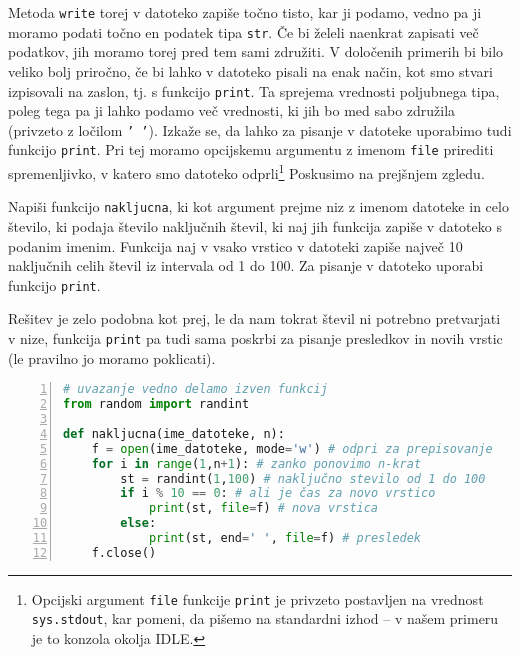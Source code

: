 Metoda \texttt{write} torej v datoteko zapiše točno tisto, kar ji podamo, vedno pa ji moramo podati točno en podatek tipa \texttt{str}. Če bi želeli naenkrat zapisati več podatkov, jih moramo torej pred tem sami združiti. V določenih primerih bi bilo veliko bolj priročno, če bi lahko v datoteko pisali na enak način, kot smo stvari izpisovali na zaslon, tj. s funkcijo \texttt{print}. Ta sprejema vrednosti poljubnega tipa, poleg tega pa ji lahko podamo več vrednosti, ki jih bo med sabo združila (privzeto z ločilom \texttt{' '}). Izkaže se, da lahko za pisanje v datoteke uporabimo tudi funkcijo \texttt{print}. Pri tej moramo opcijskemu argumentu z imenom \texttt{file} prirediti spremenljivko, v katero smo datoteko odprli\footnote{Opcijski argument \texttt{file} funkcije \texttt{print} je privzeto postavljen na vrednost \texttt{sys.stdout}, kar pomeni, da pišemo na standardni izhod -- v našem primeru je to konzola okolja IDLE.} Poskusimo na prejšnjem zgledu.
\begin{zgled}
Napiši funkcijo \texttt{nakljucna}, ki kot argument prejme niz z imenom datoteke in celo število, ki podaja število naključnih števil, ki naj jih funkcija zapiše v datoteko s podanim imenim. Funkcija naj v vsako vrstico v datoteki zapiše največ 10 naključnih celih števil iz intervala od 1 do 100. Za pisanje v datoteko uporabi funkcijo \texttt{print}.
\end{zgled}
\begin{resitev}
Rešitev je zelo podobna kot prej, le da nam tokrat števil ni potrebno pretvarjati v nize, funkcija \texttt{print} pa tudi sama poskrbi za pisanje presledkov in novih vrstic (le pravilno jo moramo poklicati).
\begin{lstlisting}[language=Python, showstringspaces=false,numbers=left]
# uvazanje vedno delamo izven funkcij
from random import randint

def nakljucna(ime_datoteke, n):
    f = open(ime_datoteke, mode='w') # odpri za prepisovanje
    for i in range(1,n+1): # zanko ponovimo n-krat
        st = randint(1,100) # naključno stevilo od 1 do 100
        if i % 10 == 0: # ali je čas za novo vrstico
            print(st, file=f) # nova vrstica
        else:
            print(st, end=' ', file=f) # presledek 
    f.close()
\end{lstlisting}
\end{resitev}


